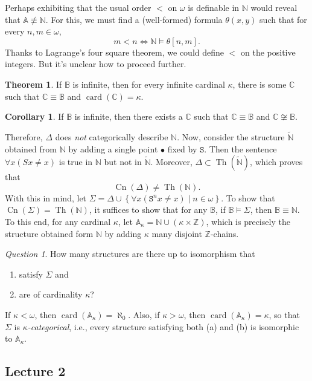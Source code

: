 \documentclass[10pt,letterpaper,cm]{nupset}
\theoremstyle{definition}
\theoremstyle{theorem}
\newtheorem{theorem}[definition]{Theorem}
\newtheorem{corollary}[definition]{Corollary}
\theoremstyle{remark}
\newtheorem*{question}{Question}
\newcommand{\A}{\mathbb A}
\newcommand{\C}{\mathbb C}
\newcommand{\N}{\mathbb N}
\renewcommand{\S}{\mathtt S}
\newcommand{\Z}{\mathbb Z}
\newcommand{\B}{\mathbb{B}}
\newcommand{\1}{\mathbf{1}}
\newcommand{\0}{\mathsf 0}
\DeclareMathOperator{\card}{\text{card}}
\DeclareMathOperator{\thh}{Th}
\DeclareMathOperator{\cn}{Cn}
\begin{document}
Perhaps exhibiting that the usual order $<$ on $\omega$ is definable in $\N$ would reveal that $\A \not \equiv \N$. For this, we must find a (well-formed) formula $\theta(x,y)$ such that for every $n,m\in \omega$, $$m<n \iff \N \models \theta[n,m].$$
Thanks to Lagrange's four square theorem, we could define $<$ on the positive integers. But it's unclear how to proceed further.

\smallskip

\begin{theorem}
If $\B$ is infinite, then for every infinite  cardinal $\kappa$, there is some $\C$ such that $\C \equiv \B$ and $\card(\C) = \kappa$.
\end{theorem}

\begin{corollary}
If $\B$ is infinite, then there exists a $\C$ such that $\C \equiv \B$ and $\C \not\cong \B$.
\end{corollary}

Therefore, $\Delta$ does \emph{not} categorically describe $\N$. Now, consider the structure $\widetilde{\N}$ obtained from $\N$ by adding a single point $\bullet$ fixed by $\S$. Then the sentence $\forall{x}\left(S{x} \ne x\right)$ is true in $\N$ but not in $\widetilde{\N}$. Moreover, $\Delta \subset \thh(\widetilde{\N})$, which proves that $$\cn(\Delta) \ne \thh(\N).$$ With this in mind, let $\Sigma = \Delta \cup \left\{ \forall{x}\left(\S^n{x} \ne x\right) \mid n \in \omega \right\}$. To show that $\cn(\Sigma) = \thh(\N)$, it suffices to show that for any $\B$, if $\B \models \Sigma$, then $\B \equiv \N$. To this end, for any cardinal $\kappa$, let $\A_{\kappa} = \N \cup \left(\kappa \times \Z\right)$, which is precisely the structure obtained form $\N$ by adding $\kappa$ many disjoint $\Z$-chains.

\begin{question}
How many structures are there up to isomorphism that 
\begin{enumerate}[label=(\alph*)]
\item satisfy $\Sigma$ and 
\item are of cardinality $\kappa$?
\end{enumerate}
\end{question}

If $\kappa < \omega$, then $\card(\A_{\kappa}) = \aleph_0$. Also, if  $\kappa > \omega$, then $\card(\A_{\kappa}) = \kappa$, so that $\Sigma$ is \textit{$\kappa$-categorical}, i.e., every structure satisfying both (a) and (b) is isomorphic to $\A_{\kappa}$.  

\subsection{Lecture 2}
\end{document}
